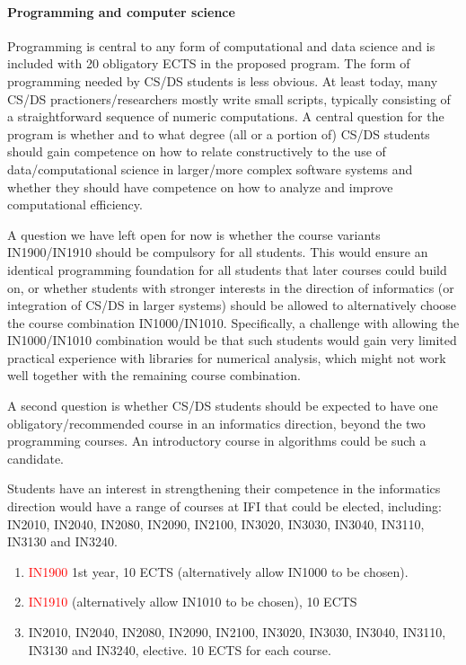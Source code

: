 \documentclass[oneside,final,10pt]{article}
\begin{document}
\paragraph{Programming and computer science}
Programming is central to any form of computational and data science and is included with 20 obligatory ECTS in the proposed program. The form of programming needed by CS/DS students is less obvious. At least today, many CS/DS practioners/researchers mostly write small scripts, typically consisting of a straightforward sequence of numeric computations. A central question for the program is whether and to what degree (all or a portion of) CS/DS students should gain competence on how to relate constructively to the use of data/computational science in larger/more complex software systems and whether they should have competence on how to analyze and improve computational efficiency. 

A question we have left open for now is whether the course variants IN1900/IN1910 should be compulsory for all students. This would ensure an identical programming foundation for all students that later courses could build on, or whether students with stronger interests in the direction of informatics (or integration of CS/DS in larger systems) should be allowed to alternatively choose the course combination IN1000/IN1010. Specifically, a challenge with allowing the IN1000/IN1010 combination would be that such students would gain very limited practical experience with libraries for numerical analysis, which might not work well together with the remaining course combination.

A second question is whether CS/DS students should be expected to have one obligatory/recommended course in an informatics direction, beyond the two programming courses. An introductory course in algorithms could be such a candidate. 

Students have an interest in strengthening their competence in the informatics direction would have a range of courses at IFI that could be elected, including: IN2010, IN2040, IN2080, IN2090, IN2100, IN3020, IN3030, IN3040, IN3110, IN3130 and IN3240.


\begin{enumerate}
    \item \textcolor{red}{IN1900} 1st year, 10 ECTS (alternatively allow IN1000 to be chosen).
    \item \textcolor{red}{IN1910} (alternatively allow IN1010 to be chosen), 10 ECTS
    \item IN2010, IN2040, IN2080, IN2090, IN2100, IN3020, IN3030, IN3040, IN3110, IN3130 and IN3240, elective. 10 ECTS for each course. 
\end{enumerate}
\end{document}
